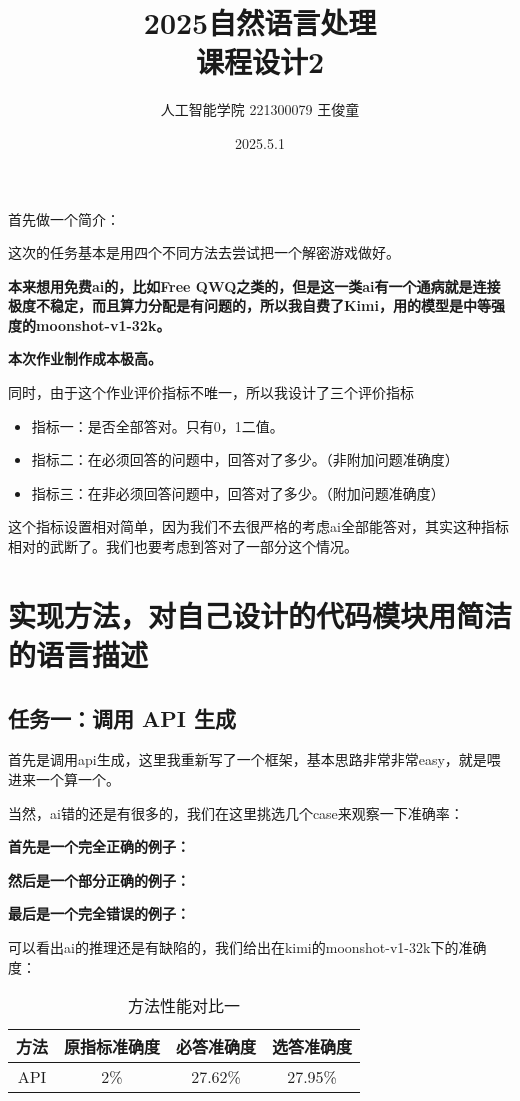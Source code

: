 \documentclass[answers]{exam}  %
\title{2025自然语言处理 \\ 课程设计2}
\date{2025.5.1}
\author{人工智能学院 221300079 王俊童}
\begin{document}
\maketitle

首先做一个简介：

这次的任务基本是用四个不同方法去尝试把一个解密游戏做好。

\textbf{本来想用免费ai的，比如Free QWQ之类的，但是这一类ai有一个通病就是连接极度不稳定，而且算力分配是有问题的，所以我自费了Kimi，用的模型是中等强度的moonshot-v1-32k。}

\textbf{本次作业制作成本极高。}

同时，由于这个作业评价指标不唯一，所以我设计了三个评价指标
\begin{itemize}
    \item 指标一：是否全部答对。只有0，1二值。
    \item 指标二：在必须回答的问题中，回答对了多少。（非附加问题准确度）
    \item 指标三：在非必须回答问题中，回答对了多少。（附加问题准确度）
\end{itemize}
这个指标设置相对简单，因为我们不去很严格的考虑ai全部能答对，其实这种指标相对的武断了。我们也要考虑到答对了一部分这个情况。

\section{实现方法，对自己设计的代码模块用简洁的语言描述}
\subsection{任务一：调用 API 生成}

首先是调用api生成，这里我重新写了一个框架，基本思路非常非常easy，就是喂进来一个算一个。

当然，ai错的还是有很多的，我们在这里挑选几个case来观察一下准确率：

\textbf{首先是一个完全正确的例子：}

\textbf{然后是一个部分正确的例子：}

\textbf{最后是一个完全错误的例子：}

可以看出ai的推理还是有缺陷的，我们给出在kimi的moonshot-v1-32k下的准确度：

\begin{table}[h]
    \centering
    \begin{tabular}{cccc}
    \toprule
    \textbf{方法} & \textbf{原指标准确度} & \textbf{必答准确度} &\textbf{选答准确度}\\
    \midrule
    API & 2\% & 27.62\% & 27.95\% \\
    \bottomrule
    \end{tabular}
    \caption{方法性能对比一}
\end{table}
\end{document}
